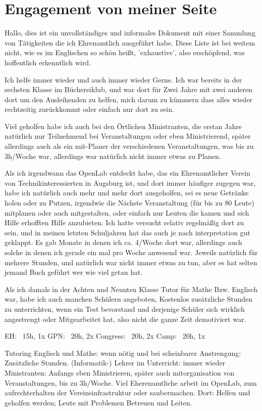 \documentclass{scrartcl}
\begin{document}
\section*{Engagement von meiner Seite}
Hallo, dies ist ein unvollständiges und informales Dokument mit einer Sammlung von Tätigkeiten
die ich Ehrenamtlich ausgeführt habe. Diese Liste ist bei weitem nicht, wie es im Englischen so
schön heißt, 'exhaustive', also erschöpfend, was hoffentlich erkenntlich wird.

Ich helfe immer wieder und auch immer wieder Gerne. Ich war bereits in der sechsten Klasse im
Büchereiklub, und war dort für Zwei Jahre mit zwei anderen dort um den Ausleihenden zu helfen,
mich darum zu kümmern dass alles wieder rechtzeitig zurückkommt oder einfach nur dort zu sein.

Viel geholfen habe ich auch bei den Örtlichen Ministranten, die erstan Jahre natürlich nur
Teilnehmend bei Veranstaltungen oder eben Ministrierend, später allerdings auch als ein
mit-Planer der verschiedenen Veranstaltungen, was bis zu 3h/Woche war, allerdings war natürlich
nicht immer etwas zu Planen.

Als ich irgendwann das OpenLab entdeckt habe, das ein Ehrenamtlicher
Verein von Technikinteressierten in Augsburg ist, und dort immer häufiger zugegen war, habe ich
natürlich auch mehr und mehr dort ausgeholfen, sei es neue Getränke holen oder zu Putzen, irgendwie
die Nächste Veranstaltung (für bis zu 80 Leute) mitplanen oder auch mitgestalten, oder einfach nur
Leuten die kamen und sich Hilfe erhofften Hilfe anzubieten. Ich hatte versucht relativ regelmäßig
dort zu sein, und in meinen letzten Schuljahren hat das auch je nach interpretation gut geklappt.
Es gab Monate in denen ich ca. 4/Woche dort war, allerdings auch solche in denen ich gerade ein
mal pro Woche anwesend war. Jeweils natürlich für mehrere Stunden, und natürlich war nicht immer
etwas zu tun, aber es hat selten jemand Buch geführt wer wie viel getan hat.

Als ich damals in
der Achten und Neunten Klasse Tutor für Mathe Bzw. Englisch war, habe ich auch manchen Schülern
angeboten, Kostenlos zusätzliche Stunden zu unterrichten, wenn ein Test bevorstand und derjenige
Schüler sich wirklich angestrengt oder Mitgearbeitet hat, also nicht die ganze Zeit demotiviert war.





EH: ~15h, 1x
GPN: ~20h, 2x
Congress: ~20h, 2x
Camp: ~20h, 1x


Tutoring Englisch und Mathe: wenn nötig und bei scheinbarer Anstrengung: Zusätzliche Stunden.
(Informatik-) Lehrer im Unterricht: immer wieder
Ministranten: Anfangs eben Ministrieren, später auch mitorganisation von Veranstaltungen, bis zu 3h/Woche.
Viel Eherenamtliche arbeit im OpenLab, zum aufrechterhalten der Vereinsinfrastruktur oder saubermachen.
Dort: Helfen und geholfen werden; Leute mit Problemen Betreuen und Leiten.
\end{document}
